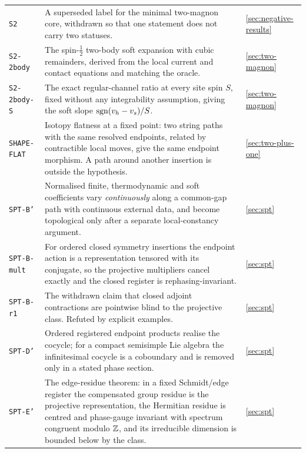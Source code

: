 {\begin{longtable}{@{}p{}p{}p{}@{}}
\texttt{S2} & A superseded label for the minimal two-magnon core, withdrawn so
that one statement does not carry two statuses. & \cref{sec:negative-results}\\

\texttt{S2-2body} & The spin-$\tfrac12$ two-body soft expansion with cubic
remainders, derived from the local current and contact equations and matching
the oracle. & \cref{sec:two-magnon}\\

\texttt{S2-2body-S} & The exact regular-channel ratio at every site spin $S$,
fixed without any integrability assumption, giving the soft slope
$\operatorname{sgn}(v_h-v_s)/S$. & \cref{sec:two-magnon}\\

\texttt{SHAPE-FLAT} & Isotopy flatness at a fixed point: two string paths with
the same resolved endpoints, related by contractible local moves, give the
same endpoint morphism. A path around another insertion is outside the
hypothesis. & \cref{sec:two-plus-one}\\

\texttt{SPT-B'} & Normalised finite, thermodynamic and soft coefficients vary
\emph{continuously} along a common-gap path with continuous external data, and
become topological only after a separate local-constancy argument. & \cref{sec:spt}\\

\texttt{SPT-B-mult} & For ordered closed symmetry insertions the endpoint
action is a representation tensored with its conjugate, so the projective
multipliers cancel exactly and the closed register is rephasing-invariant. & \cref{sec:spt}\\

\texttt{SPT-B-r1} & The withdrawn claim that closed adjoint contractions are
pointwise blind to the projective class. Refuted by explicit examples. & \cref{sec:spt}\\

\texttt{SPT-D'} & Ordered registered endpoint products realise the cocycle;
for a compact semisimple Lie algebra the infinitesimal cocycle is a coboundary
and is removed only in a stated phase section. & \cref{sec:spt}\\

\texttt{SPT-E'} & The edge-residue theorem: in a fixed Schmidt/edge register
the compensated group residue is the projective representation, the Hermitian
residue is centred and phase-gauge invariant with spectrum congruent modulo
$\mathbb{Z}$, and its irreducible dimension is bounded below by the class. & \cref{sec:spt}\\


\end{longtable}}
